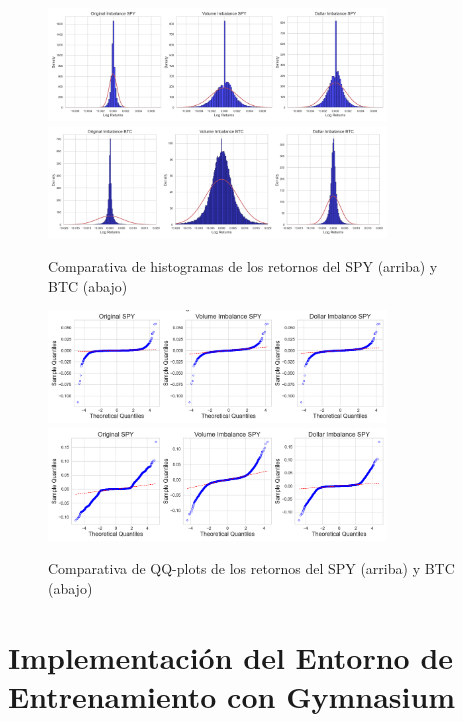 \documentclass[a4paper,12pt, twoside]{report}
\begin{document}
\begin{figure}[H]
    \centering
    \includegraphics[width=0.8\textwidth]{figures/SPY_histogram_comparation.png}
    \includegraphics[width=0.8\textwidth]{figures/BTC_histogram_comparation.png}
    \caption{Comparativa de histogramas de los retornos del SPY (arriba) y BTC (abajo)}
    \label{fig:histogram_comparison}
\end{figure}

\begin{figure}[H]
    \centering
    \includegraphics[width=0.8\textwidth]{figures/SPY_qq_comparison.png}
    \includegraphics[width=0.8\textwidth]{figures/BTC_qq_comparison.png}
    \caption{Comparativa de QQ-plots de los retornos del SPY (arriba) y BTC (abajo)}
    \label{fig:qqplot_comparison}
\end{figure}
\section{Implementación del Entorno de Entrenamiento con Gymnasium}
\end{document}
